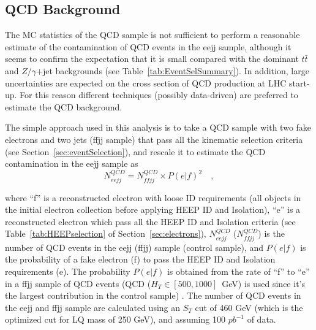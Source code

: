 \documentclass{cmspaper}
\begin{document}
\begin{linenumbers}
%
%

\subsection{QCD Background} \label{sec:QCDBackground}

The MC statistics of the QCD sample is not sufficient to perform a reasonable estimate of the contamination 
of QCD events in the eejj sample, although it seems to confirm the expectation that it is small compared with 
the dominant $t\bar{t}$ and $Z/\gamma$+jet backgrounds (see Table~\ref{tab:EventSelSummary}). 
In addition, large uncertainties are expected on the cross section of QCD production at LHC start-up.
For this reason different techniques (possibly data-driven) are preferred to estimate the QCD background.

The simple approach used in this analysis is to take a QCD sample with two fake electrons and two jets (ffjj sample)
that pass all the kinematic selection criteria (see Section~\ref{sec:eventSelection}), and rescale it to estimate 
the QCD contamination in the eejj sample as
%
\begin{equation} \label{QCDRescaling}
N_{eejj}^{QCD} = N_{ffjj}^{QCD} \times {P(e|f)}^2 \quad , 
\end{equation}
%

where ``f'' is a reconstructed electron with loose ID requirements (all objects in the initial electron collection 
before applying HEEP ID and Isolation), 
``e'' is a reconstructed electron which pass all the HEEP ID and Isolation criteria (see Table~\ref{tab:HEEPselection} 
of Section~\ref{sec:electrons}), 
$N_{eejj}^{QCD}$ ($N_{ffjj}^{QCD}$) is the number of QCD events in the eejj (ffjj) sample (control sample), 
and $P(e|f)$ is the probability of a fake electron (f) to pass the HEEP ID and Isolation requirements (e).
The probability $P(e|f)$ is obtained from the rate of ``f'' to ``e'' in a ffjj sample of QCD events 
(QCD ($H_T\in[500,1000]$~GeV) is used since it's the largest contribution in the control sample) .
The number of QCD events in the eejj and ffjj sample are calculated using 
an $S_{T}$ cut of 460 GeV (which is the optimized cut for LQ mass of 250 GeV), and assuming 100 $pb^{-1}$ of data.


\end{linenumbers}
\end{document}
